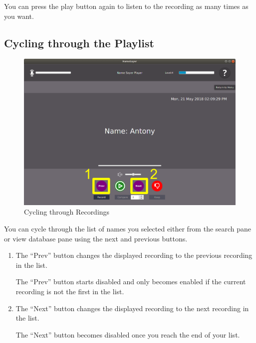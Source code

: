 \documentclass[a4paper,12pt]{article}
\begin{document}
You can press the play button again to listen to the recording as many times as you want.

\subsection{Cycling through the Playlist}
\begin{figure}[!h]
	\includegraphics[width=\linewidth]{cycling.png}
	\caption{Cycling through Recordings}
\end{figure}
You can cycle through the list of names you selected either from the search pane or view database pane using the next and previous buttons.
\begin{enumerate}[label=\textbf{\arabic*}]
	\item The “Prev” button changes the displayed recording to the previous recording in the list.
	
	The “Prev” button starts disabled and only becomes enabled if the current recording is not the first in the list.
	
	\item The “Next” button changes the displayed recording to the next recording in the list.
	
	The “Next” button becomes disabled once you reach the end of your list.
	
\end{enumerate}
\newpage
\end{document}

